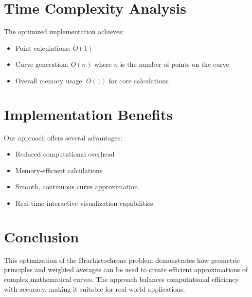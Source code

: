 \documentclass{article}
\begin{document}
\section{Time Complexity Analysis}
The optimized implementation achieves:
\begin{itemize}
    \item Point calculations: $O(1)$
    \item Curve generation: $O(n)$ where $n$ is the number of points on the curve
    \item Overall memory usage: $O(1)$ for core calculations
\end{itemize}

\section{Implementation Benefits}
Our approach offers several advantages:
\begin{itemize}
    \item Reduced computational overhead
    \item Memory-efficient calculations
    \item Smooth, continuous curve approximation
    \item Real-time interactive visualization capabilities
\end{itemize}

\section{Conclusion}
This optimization of the Brachistochrone problem demonstrates how geometric principles and weighted averages can be used to create efficient approximations of complex mathematical curves. The approach balances computational efficiency with accuracy, making it suitable for real-world applications.
\end{document}

